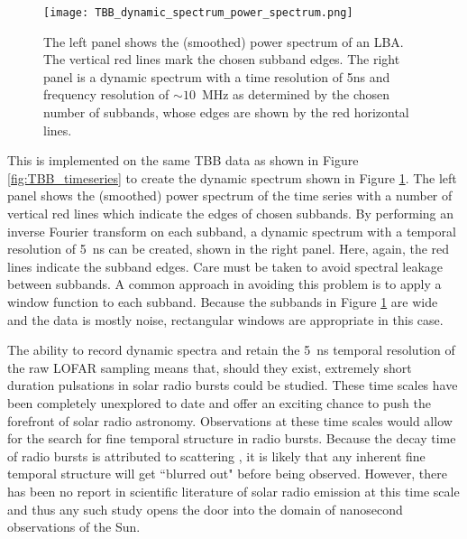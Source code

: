 \begin{figure}[ht]
\centering
\texttt{[image: TBB\_dynamic\_spectrum\_power\_spectrum.png]}
\caption[A dynamic spectrum generated with TBB data from I-LOFAR.]{The left panel shows the (smoothed) power spectrum of an LBA. The vertical red lines mark the chosen subband edges. The right panel is a dynamic spectrum with a time resolution of 5ns and frequency resolution of $\sim 10$~MHz as determined by the chosen number of subbands, whose edges are shown by the red horizontal lines.}
\label{fig:TBB_dynamicspectrum}
\end{figure}

This is implemented on the same TBB data as shown in Figure \ref{fig:TBB_timeseries} to create the dynamic spectrum shown in Figure \ref{fig:TBB_dynamicspectrum}. The left panel shows the (smoothed) power spectrum of the time series with a number of vertical red lines which indicate the edges of chosen subbands. By performing an inverse Fourier transform on each subband, a dynamic spectrum with a temporal resolution of 5~ns can be created, shown in the right panel. Here, again, the red lines indicate the subband edges. Care must be taken to avoid spectral leakage between subbands. A common approach in avoiding this problem is to apply a window function to each subband. Because the subbands in Figure \ref{fig:TBB_dynamicspectrum} are wide and the data is mostly noise, rectangular windows are appropriate in this case.
 
The ability to record dynamic spectra and retain the 5~ns temporal resolution of the raw LOFAR sampling means that, should they exist, extremely short duration pulsations in solar radio bursts could be studied. These time scales have been completely unexplored to date and offer an exciting chance to push the forefront of solar radio astronomy. Observations at these time scales would allow for the search for fine temporal structure in radio bursts. Because the decay time of radio bursts is attributed to scattering \citep{Krupar2020}, it is likely that any inherent fine temporal structure will get ``blurred out" before being observed. However, there has been no report in scientific literature of solar radio emission at this time scale and thus any such study opens the door into the domain of nanosecond observations of the Sun.

